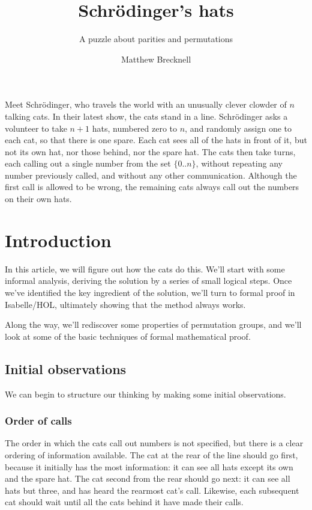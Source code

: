 \documentclass[10pt,a4paper]{scrartcl}
\title{Schr\"odinger's hats}
\subtitle{A puzzle about parities and permutations}
\author{Matthew Brecknell}
\begin{document}
\maketitle

Meet Schr\"odinger, who travels the world with an unusually clever clowder of
$n$ talking cats. In their latest show, the cats stand in a line.
Schr\"odinger asks a volunteer to take $n+1$ hats, numbered zero to $n$, and
randomly assign one to each cat, so that there is one spare. Each cat sees all
of the hats in front of it, but not its own hat, nor those behind, nor the
spare hat. The cats then take turns, each calling out a single number from the
set $\{0..n\}$, without repeating any number previously called, and without any
other communication. Although the first call is allowed to be wrong, the
remaining cats always call out the numbers on their own hats.

\section{Introduction}

In this article, we will figure out how the cats do this. We'll start with some
informal analysis, deriving the solution by a series of small logical steps.
Once we've identified the key ingredient of the solution, we'll turn to formal
proof in Isabelle/HOL, ultimately showing that the method always works.

Along the way, we'll rediscover some properties of permutation groups, and
we'll look at some of the basic techniques of formal mathematical proof.

\subsection{Initial observations}

We can begin to structure our thinking by making some initial observations.

\subsubsection{Order of calls}

The order in which the cats call out numbers is not specified, but there is a
clear ordering of information available. The cat at the rear of the line should
go first, because it initially has the most information: it can see all hats
except its own and the spare hat. The cat second from the rear should go next:
it can see all hats but three, and has heard the rearmost cat's call. Likewise,
each subsequent cat should wait until all the cats behind it have made their
calls.
\end{document}
